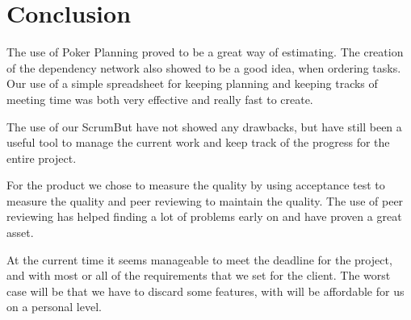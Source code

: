 \section{Conclusion}


The use of Poker Planning proved to be a great way of estimating. The creation of the dependency network also showed to be a good idea, when ordering tasks.
Our use of a simple spreadsheet for keeping planning and keeping tracks of meeting time was both very effective and really fast to create.

The use of our ScrumBut have not showed any drawbacks, but have still been a useful tool to manage the current work and keep track of the progress for the entire project.

For the product we chose to measure the quality by using acceptance test to measure the quality and peer reviewing to maintain the quality.
The use of peer reviewing has helped finding a lot of problems early on and have proven a great asset.

At the current time it seems manageable to meet the deadline for the project, and with most or all of the requirements that we set for the client. The worst case will be that we have to discard some features, with will be affordable for us on a personal level. 
